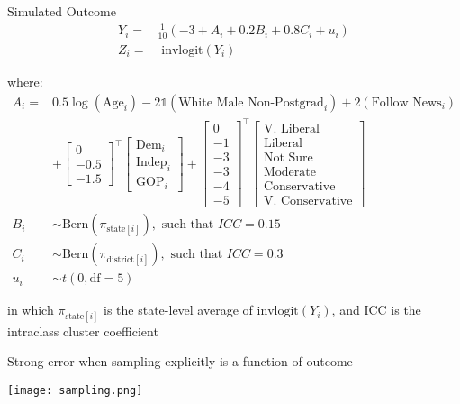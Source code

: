 \documentclass[ignorenonframetext, 10pt, aspectratio=169]{beamer}
\begin{document}
\begin{frame}
{Simulated Outcome}
\vspace{-2em}
\begin{align*}
Y_i =& \frac{1}{10}(-3 + A_i + 0.2 B_i + 0.8 C_i + u_i)\\
Z_i =& \text{ invlogit}(Y_i)
\end{align*}

where:
\begin{align*}
A_i =& 0.5\log(\text{Age}_i) -2\mathds{1}(\text{White Male Non-Postgrad}_i) + 2(\text{Follow News}_i)\\ &+\begin{bmatrix}0\\-0.5\\-1.5\end{bmatrix}^\top\begin{bmatrix}\text{Dem}_{i}\\\text{Indep}_i\\\text{GOP}_i\end{bmatrix} + \begin{bmatrix}0\\-1\\-3\\-3\\-4\\-5\end{bmatrix}^\top\begin{bmatrix}\text{V. Liberal}\\\text{Liberal}\\\text{Not Sure}\\\text{Moderate}\\\text{Conservative}\\\text{V. Conservative}\end{bmatrix}\\
B_i &\sim \text{Bern}(\pi_{\text{state}[i]}), \text{ such that }  ICC = 0.15\\
C_i &\sim \text{Bern}(\pi_{\text{district}[i]}), \text{ such that }  ICC = 0.3\\
u_i &\sim t(0, \text{df} = 5)
\end{align*}

\normalsize
in which \(\pi_{\text{state}[i]}\) is the state-level average of \(\text{invlogit}(Y_i)\), and ICC is the intraclass cluster coefficient


\end{frame}

\begin{frame}
{Strong error when sampling explicitly is a function of outcome}

\centering
\texttt{[image: sampling.png]}
\end{frame}
\end{document}
